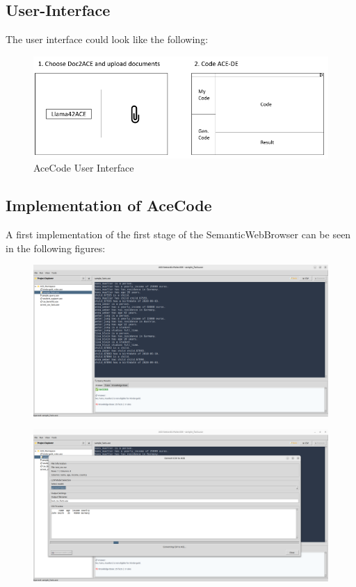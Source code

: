 \documentclass[12pt,a4paper]{article}
\begin{document}
\subsection{User-Interface}

The user interface could look like the following:

\begin{figure}[h]
\includegraphics[width=16cm]{ui_mock}
\caption{AceCode User Interface}
\end{figure}

\subsection{Implementation of AceCode}

A first implementation of the first stage of the SemanticWebBrowser can be seen in the following figures:

\begin{figure}[h]
    \includegraphics[width=16cm]{ace_code_screenshot_1}
\end{figure}

\begin{figure}[h]
    \includegraphics[width=16cm]{ace_code_screenshot_2}
\end{figure}
\end{document}
